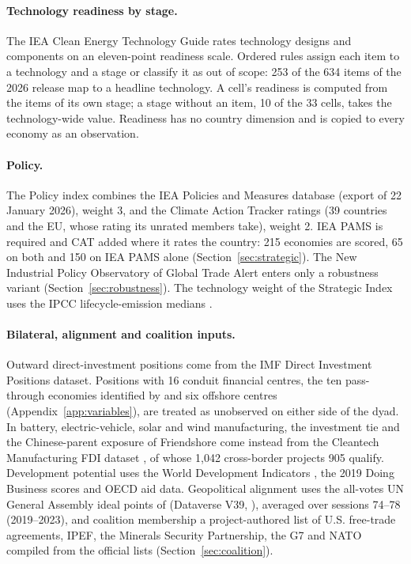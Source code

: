 \paragraph{Technology readiness by stage.} The IEA Clean Energy Technology Guide
\citep{iea2026cleantechguide} rates technology designs and components on an eleven-point
readiness scale. Ordered rules assign each item to a technology and a stage or classify it as out
of scope: 253 of the 634 items of the 2026 release map to a headline technology. A cell's
readiness is computed from the items of its own stage; a stage without an item, 10 of the 33
cells, takes the technology-wide value. Readiness has no country dimension and is copied to every
economy as an observation.

\paragraph{Policy.} The Policy index combines the IEA Policies and Measures database
\citep{iea2026pams} (export of 22 January 2026), weight 3, and the Climate Action Tracker ratings
\citep{cat2026ratings} (39 countries and the EU, whose rating its unrated members take), weight 2.
IEA PAMS is required and CAT added where it rates the country: 215 economies are scored, 65 on
both and 150 on IEA PAMS alone (Section~\ref{sec:strategic}). The New Industrial Policy
Observatory of Global Trade Alert \citep{gta2026nipo} enters only a robustness variant
(Section~\ref{sec:robustness}). The technology weight of the Strategic Index uses the IPCC
lifecycle-emission medians \citep{schlomer2014annex}.

\paragraph{Bilateral, alignment and coalition inputs.} Outward direct-investment positions come
from the IMF Direct Investment Positions dataset. Positions with 16 conduit financial centres,
the ten pass-through economies identified by \citet{damgaard2024real} and six offshore centres
(Appendix~\ref{app:variables}), are treated as unobserved on either side of the dyad. In battery, electric-vehicle, solar and wind manufacturing, the investment tie and the
Chinese-parent exposure of Friendshore come instead from the Cleantech Manufacturing FDI dataset
\citep{bandara2026cmfdi}, of whose 1,042 cross-border projects 905 qualify. Development potential
uses the World Development Indicators \citep{worldbank2026wdi}, the 2019 Doing Business scores
\citep{worldbank2020doing,worldbank2021discontinue} and OECD aid data. Geopolitical alignment
uses the all-votes UN General Assembly ideal points of \citet{bailey2017estimating} (Dataverse
V39, \citealp{voeten2009unga}), averaged over sessions 74--78 (2019--2023), and coalition
membership a project-authored list of U.S. free-trade agreements, IPEF, the Minerals Security
Partnership, the G7 and NATO compiled from the official lists (Section~\ref{sec:coalition}).

